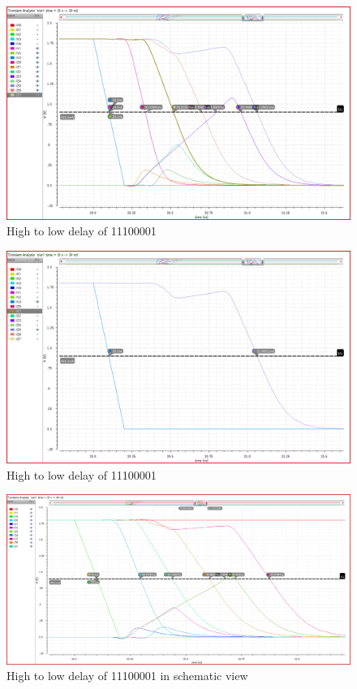 \documentclass[conference]{IEEEtran}
\begin{document}
\begin{figure}[h!]
    \centering
    \includegraphics[width=0.9\linewidth]{mul_11100001_down_all.png}
    \caption{High to low delay of 11100001}
\end{figure}

\begin{figure}[h!]
    \centering
    \includegraphics[width=0.9\linewidth]{mul_11100001_down_max.png}
    \caption{High to low delay of 11100001}
\end{figure}

\begin{figure}[h!]
    \centering
    \includegraphics[width=0.9\linewidth]{mul_sch_down_all.png}
    \caption{High to low delay of 11100001 in schematic view}
\end{figure}
\end{document}
